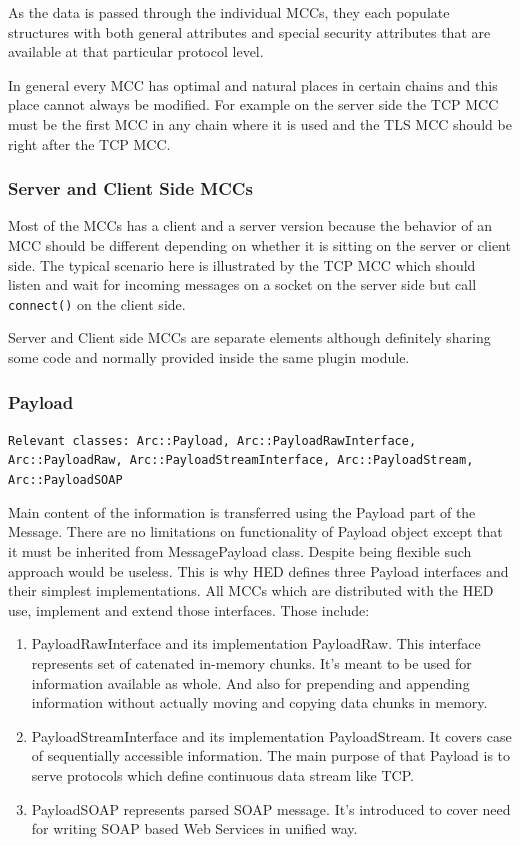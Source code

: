 \documentclass{book}
\begin{document}
As the data is passed through the individual MCCs, they each populate structures with both general attributes and special security attributes that are available at that particular protocol level.

In general every MCC has optimal and natural places in certain chains and this place cannot always be modified. For example on the server side the TCP MCC must be the first MCC in any chain where it is used and the TLS MCC should be right after the TCP MCC.


\subsubsection{Server and Client Side MCCs}

Most of the MCCs has a client and a server version because the behavior of an MCC should be different depending on whether it is sitting on the server or client side. The typical scenario here is illustrated by the TCP MCC which should listen and wait for incoming messages on a socket on the server side but call \texttt{connect()} on the client side.

Server and Client side MCCs are separate elements although definitely sharing some code and normally provided inside the same plugin module.


\subsubsection{Payload}

\texttt{Relevant classes: Arc::Payload, Arc::PayloadRawInterface, Arc::PayloadRaw, Arc::PayloadStreamInterface, Arc::PayloadStream, Arc::PayloadSOAP}

Main content of the information is transferred using the Payload part of the Message. There are no limitations on functionality of Payload object except that it must be inherited from MessagePayload class. Despite being flexible such approach would be useless. This is why HED defines three Payload interfaces and their simplest implementations. All MCCs which are distributed with the HED use, implement and extend those interfaces. Those include:

\begin{enumerate}

\item PayloadRawInterface and its implementation PayloadRaw. This interface represents set of catenated in-memory chunks. It's meant to be used for information available as whole. And also for prepending and appending information without actually moving and copying data chunks in memory.

\item PayloadStreamInterface and its implementation PayloadStream. It covers case of sequentially accessible information. The main purpose of that Payload is to serve protocols which define continuous data stream like TCP.

\item PayloadSOAP represents parsed SOAP message. It's introduced to cover need for writing SOAP based Web Services in unified way.

\end{enumerate}
\end{document}
